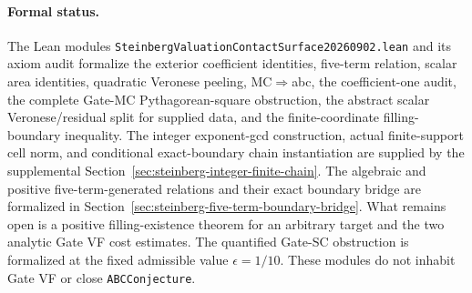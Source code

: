 \paragraph{Formal status.}
The Lean modules
\texttt{SteinbergValuationContactSurface20260902.lean} and its axiom audit
formalize the exterior coefficient identities, five-term relation, scalar
area identities, quadratic Veronese peeling, MC$\Rightarrow$abc, the
coefficient-one audit, the complete Gate-MC Pythagorean-square obstruction,
the abstract scalar Veronese/residual split for supplied data, and the
finite-coordinate filling-boundary inequality.  The integer exponent-gcd
construction, actual finite-support cell norm, and conditional exact-boundary
chain instantiation are supplied by the supplemental
Section~\ref{sec:steinberg-integer-finite-chain}.  The algebraic and positive
five-term-generated relations and their exact boundary bridge are formalized
in Section~\ref{sec:steinberg-five-term-boundary-bridge}.  What remains open
is a positive filling-existence theorem for an arbitrary target and the two
analytic Gate VF cost estimates.
The quantified Gate-SC obstruction is formalized at the fixed admissible
value $\epsilon=1/10$.  These modules do not inhabit Gate VF or close
\texttt{ABCConjecture}.
